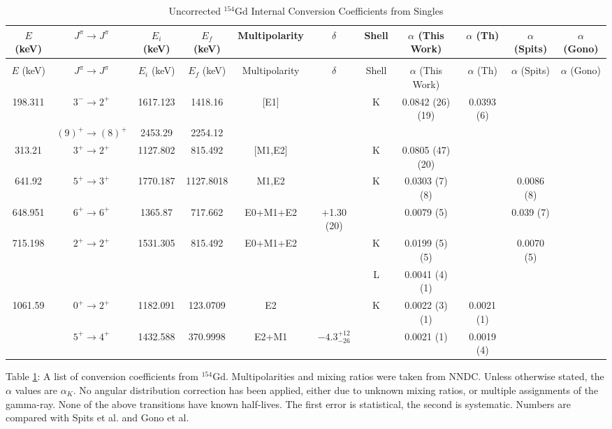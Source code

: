\begin{sidewaystable}
\footnotesize
    \begin{longtable}{c|c|c|c|c|c|c|c|c|c|c}
        \caption{Uncorrected $^{154}$Gd Internal Conversion Coefficients from Singles}
        \label{tab:154Gd_Single_ICC_Uncorr}\\
        \toprule
        $E$ (keV)	&	$J^{\pi}	\rightarrow	J^{\pi}$	&	$E_i$ (keV)	&	$E_f$ (keV)	&	Multipolarity	&	$\delta$ & Shell	&	$\alpha$ (This Work)				&	$\alpha$  (Th)	&	$\alpha$ (Spits) & $\alpha$ (Gono)		\\
        \hline
        \endfirsthead
        \caption[]{Uncorrected $^{154}$Gd Internal Conversion Coefficients from Singles}\\
        \toprule
        $E$ (keV)	&	$J^{\pi}	\rightarrow	J^{\pi}$	&	$E_i$ (keV)	&	$E_f$ (keV)	&	Multipolarity	&	$\delta$ & Shell	&	$\alpha$ (This Work) 			&	$\alpha$  (Th)	&	$\alpha$ (Spits) & $\alpha$ (Gono)	\\
        \hline
	    \endhead
	    \hline
        198.311	&	$3^-	\rightarrow	2^+$	&	1617.123	&	1418.16		&	[E1]	&		& K &	0.0842	(26) (19)	&	0.0393 (6)	&		\\
	    &	$(9)^+	\rightarrow	(8)^+$	&	2453.29	&	2254.12		&		&		&					&		&	&	\\
	    \hline
        313.21	&	$3^+	\rightarrow	2^+$	&	1127.802	&	815.492		&	[M1,E2]	&	 & K	&	0.0805	(47) (20)	&		&		\\
        \hline
        641.92	&	$5^+	\rightarrow	3^+$	&	1770.187	&	1127.8018		&	M1,E2	&		& K &	0.0303 (7) (8)	&		&	0.0086 (8)	\\
        648.951	&	$6^+	\rightarrow	6^+$	&	1365.87	&	717.662		&	E0+M1+E2	&	+1.30 (20)	&		&	0.0079 (5)	&	& 0.039 (7)	\\
        \hline
        715.198	&	$2^+	\rightarrow	2^+$	&	1531.305	&	815.492		&	E0+M1+E2	&		& K &	0.0199	(5) (5)	&		&	0.0070 (5)	\\
	    &				&		&			&		&		& L &	0.0041	(4) (1)	&		&		\\
	    \hline
        1061.59	&	$0^+	\rightarrow	2^+$	&	1182.091	&	123.0709		&	E2	&		& K &	0.0022	(3) (1)	&	0.0021 (1)	&		\\
	    &	$5^+	\rightarrow	4^+$	&	1432.588	&	370.9998		&	E2+M1	&	$-4.3^{+12}_{-26}$	&			&	0.0021 (1)	&	0.0019 (4) & &	\\
        \bottomrule
    \end{longtable}
    \item{Table \ref{tab:154Gd_Single_ICC_Uncorr}: A list of conversion coefficients from $^{154}$Gd. Multipolarities and mixing ratios were taken from NNDC. Unless otherwise stated, the $\alpha$ values are $\alpha_K$. No angular distribution correction has been applied, either due to unknown mixing ratios, or multiple assignments of the gamma-ray. None of the above transitions have known half-lives. The first error is statistical, the second is systematic. Numbers are compared with Spits et al.\citep{spits96:_154gd} and Gono et al.\citep{gono74:_154gd_e0}}
\end{sidewaystable}